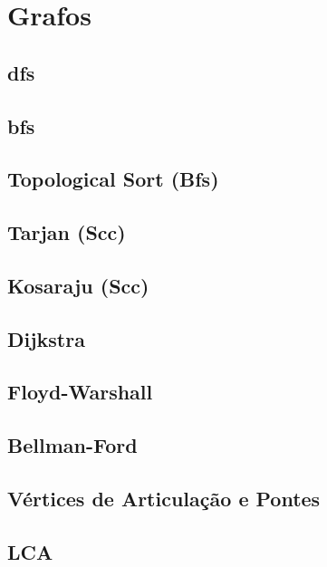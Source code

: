\section{Grafos}
\subsection{dfs}
\raggedbottom
\hrulefill
\subsection{bfs}
\raggedbottom
\hrulefill
\subsection{Topological Sort (Bfs)}
\raggedbottom
\hrulefill
\subsection{Tarjan (Scc)}
\raggedbottom
\hrulefill
\subsection{Kosaraju (Scc)}
\raggedbottom
\hrulefill
\subsection{Dijkstra}
\raggedbottom
\hrulefill
\subsection{Floyd-Warshall}
\raggedbottom
\hrulefill
\subsection{Bellman-Ford}
\raggedbottom
\hrulefill
\subsection{Vértices de Articulação e Pontes}
\raggedbottom
\hrulefill
\subsection{LCA}
\raggedbottom
\hrulefill
